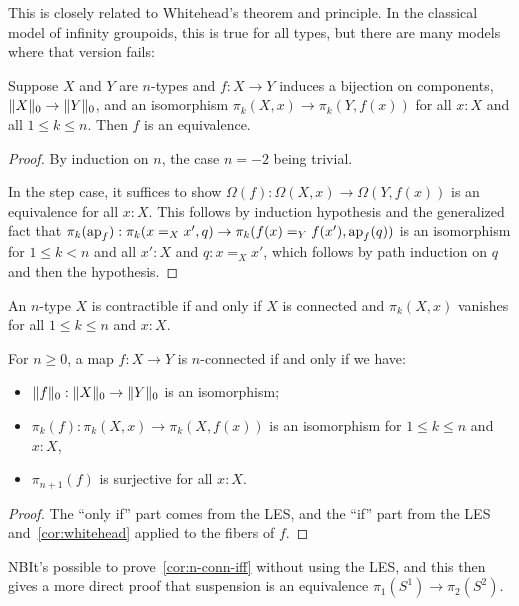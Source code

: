 \documentclass[10pt,oneside,leqno,openright]{memoir}
\begin{document}
This is closely related to Whitehead's theorem and principle. In the classical model of infinity groupoids, this is true for all types, but there are many models where that version fails:
\begin{theorem}[Whitehead]
  \label{thm:whitehead}
  Suppose $X$ and $Y$ are $n$-types and $f:X\to Y$ induces a bijection on
  components, $\lVert X\rVert_0 \to \lVert Y\rVert_0$, and an isomorphism
  $\pi_k(X,x) \to \pi_k(Y,f(x))$ for all $x:X$ and all $1\le k\le n$.
  Then $f$ is an equivalence.
\end{theorem}
\begin{proof}
  By induction on $n$, the case $n=-2$ being trivial.

  In the step case, it suffices to show
  $\Omega(f) : \Omega(X,x) \to \Omega(Y,f(x))$ is an equivalence for all $x:X$.
  This follows by induction hypothesis and the generalized fact that
  $\pi_k(\operatorname{ap}_f) : \pi_k(x=_Xx',q) \to \pi_k(f(x)=_Yf(x'), \operatorname{ap}_f(q))$ is an
  isomorphism for $1\le k < n$ and all $x':X$ and $q:x=_Xx'$, which follows by
  path induction on $q$ and then the hypothesis.
\end{proof}

\begin{corollary}
  \label{cor:whitehead}
  An $n$-type $X$ is contractible if and only if $X$ is connected and
  $\pi_k(X,x)$ vanishes for all $1\le k\le n$ and $x:X$.
\end{corollary}
\begin{corollary}
  \label{cor:n-conn-iff}
  For $n\ge 0$, a map $f:X\to Y$ is $n$-connected if and only if we have:
  \begin{itemize}
  \item $\lVert f\rVert_0 : \lVert X\rVert_0 \to \lVert Y\rVert_0$ is an isomorphism;
  \item $\pi_k(f) : \pi_k(X,x) \to \pi_k(X,f(x))$ is an isomorphism for $1\le k\le n$ and $x:X$,
  \item $\pi_{n+1}(f)$ is surjective for all $x:X$.
  \end{itemize}
\end{corollary}
\begin{proof}
  The ``only if'' part comes from the LES, and the ``if'' part from the LES
  and~\cref{cor:whitehead} applied to the fibers of $f$.
\end{proof}

NB\enspace It's possible to prove~\cref{cor:n-conn-iff} without using the LES,
and this then gives a more direct proof that suspension is an equivalence $\pi_1(S^1) \to \pi_2(S^2)$.
\end{document}
